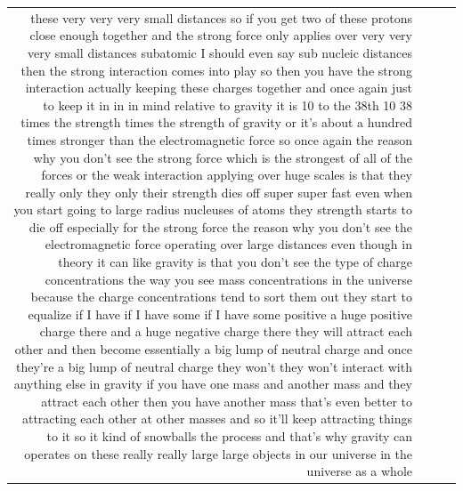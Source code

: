 \documentclass[10pt]{article}
\begin{document}
\begin{tiny}
\begin{longtable}{r p{0.3in} p{1.212in} p{3.8in}}
these very very very small distances so if you get two of these protons close enough together and the strong force only applies over very very very small distances subatomic I should even say sub nucleic distances then the strong interaction comes into play so then you have the strong interaction actually keeping these charges together and once again just to keep it in in in mind relative to gravity it is 10 to the 38th 10 38 times the strength times the strength of gravity or it's about a hundred times stronger than the electromagnetic force so once again the reason why you don't see the strong force which is the strongest of all of the forces or the weak interaction applying over huge scales is that they really only they only their strength dies off super super fast even when you start going to large radius nucleuses of atoms they strength starts to die off especially for the strong force the reason why you don't see the electromagnetic force operating over large distances even though in theory it can like gravity is that you don't see the type of charge concentrations the way you see mass concentrations in the universe because the charge concentrations tend to sort them out they start to equalize if I have if I have some if I have some positive a huge positive charge there and a huge negative charge there they will attract each other and then become essentially a big lump of neutral charge and once they're a big lump of neutral charge they won't they won't interact with anything else in gravity if you have one mass and another mass and they attract each other then you have another mass that's even better to attracting each other at other masses and so it'll keep attracting things to it so it kind of snowballs the process and that's why gravity can operates on these really really large large objects in our universe in the universe as a whole \\

\end{longtable}
\end{tiny}
\end{document}

